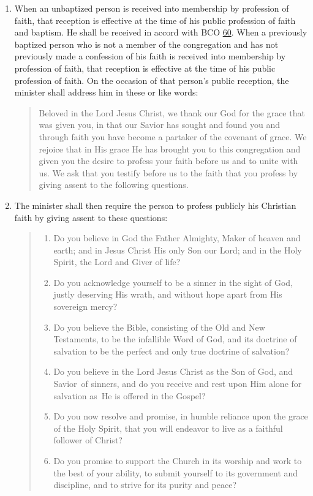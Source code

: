 \documentclass[
]{book}
\providecommand{\tightlist}{%
  \setlength{\itemsep}{0pt}\setlength{\parskip}{0pt}}
\begin{document}
\protect\hypertarget{chapter-slug-67-reception-of-new-members-by-public-profession-of-faith}{\href{}{}}

\begin{enumerate}
\def\labelenumi{\arabic{enumi}.}
\item
  When an unbaptized person is received into membership by profession of faith, that reception is effective at the time of his public profession of faith and baptism. He shall be received in accord with BCO \protect\hyperlink{60}{60}. When a previously baptized person who is not a member of the congregation and has not previously made a confession of his faith is received into membership by profession of faith, that reception is effective at the time of his public profession of faith. On the occasion of that person's public reception, the minister shall address him in these or like words:

  \begin{quote}
  Beloved in the Lord Jesus Christ, we thank our God for the grace that was given you, in that our Savior has sought and found you and through faith you have become a partaker of the covenant of grace. We rejoice that in His grace He has brought you to this congregation and given you the desire to profess your faith before us and to unite with us. We ask that you testify before us to the faith that you profess by giving assent to the following questions.
  \end{quote}
\item
  The minister shall then require the person to profess publicly his Christian faith by giving assent to these questions:

  \begin{quote}
  \begin{enumerate}
  \def\labelenumii{(\arabic{enumii})}
  \tightlist
  \item
    Do you believe in God the Father Almighty, Maker of heaven and earth; and in Jesus Christ His only Son our Lord; and in the Holy Spirit, the Lord and Giver of life?
  \item
    Do you acknowledge yourself to be a sinner in the sight of God, justly deserving His wrath, and without hope apart from His sovereign mercy?
  \item
    Do you believe the Bible, consisting of the Old and New Testaments, to be the infallible Word of God, and its doctrine of salvation to be the perfect and only true doctrine of salvation?
  \item
    Do you believe in the Lord Jesus Christ as the Son of God, and Savior~of sinners, and do you receive and rest upon Him alone for salvation as~He is offered in the Gospel?
  \item
    Do you now resolve and promise, in humble reliance upon the grace of the Holy Spirit, that you will endeavor to live as a faithful follower of Christ?
  \item
    Do you promise to support the Church in its worship and work to the best of your ability, to submit yourself to its government and discipline, and to strive for its purity and peace?
  \end{enumerate}
  \end{quote}


\end{enumerate}
\end{document}
